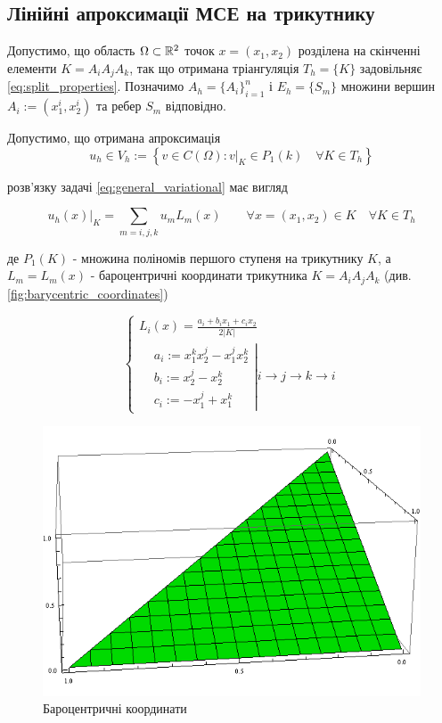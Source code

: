 \subsection{Лінійні апроксимації МСЕ на трикутнику}

Допустимо, що область $\Omega \subset \mathbb{R}^2$ точок $x = (x_1, x_2)$ розділена на скінченні елементи $K = A_iA_jA_k$,
	так що отримана тріангуляція $T_h = \lbrace K \rbrace$ задовільняє
\eqref{eq:split_properties}.
Позначимо $A_h = \lbrace A_i \rbrace_{i=1}^n$ і $E_h = \lbrace S_m \rbrace$ множини вершин $A_i := (x_1^i, x_2^i)$ та ребер $S_m$ відповідно.

Допустимо, що отримана апроксимація
\begin{equation}
	u_h \in V_h := \left\lbrace v \in C(\Omega) : v|_K \in P_1(k) \quad \forall K \in T_h \right\rbrace
\end{equation}

розв'язку задачі
\eqref{eq:general_variational} має вигляд

\begin{equation}
	u_h(x)|_K = \sum \limits_{m=i,j,k} u_m L_m (x) \qquad \forall x=(x_1, x_2) \in K \quad \forall K \in T_h
\end{equation}

де $P_1(K)$ - множина поліномів першого ступеня на трикутнику $K$, а $L_m = L_m(x)$ -
	бароцентричні координати трикутника $K = A_i A_j A_k$ (див. \autoref{fig:barycentric_coordinates})

\begin{equation}\label{eq:barycentric_coord}
	\begin{cases}
		L_i(x) = \frac{a_i + b_i x_1 + c_i x_2}{2 |K|} \\
			\left.
			\begin{split}
				&a_i := x_1^k x_2^j - x_1^j x_2^k \\
				&b_i := x_2^j -x_2^k \\
				&c_i := -x_1^j+x_1^k
			\end{split}
			\right|
			i \to j \to k \to i
	\end{cases}
\end{equation}

\begin{figure}[H]
	\centering
    \includegraphics[scale=0.5]{images/barycentric}
    \caption{Бароцентричні координати}
    \label{fig:barycentric_coordinates}
\end{figure}
